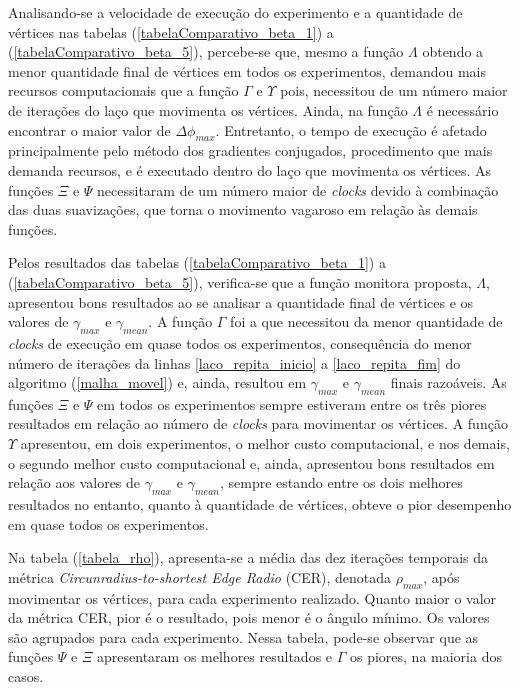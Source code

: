 Analisando-se a velocidade de execução do experimento e a quantidade de vértices nas tabelas (\ref{tabelaComparativo_beta_1}) a (\ref{tabelaComparativo_beta_5}), percebe-se que, mesmo a função $\Lambda$ obtendo a menor quantidade final de vértices em todos os experimentos,  demandou mais recursos computacionais que a função $\Gamma$ e $\Upsilon$ pois, necessitou de um número maior de iterações do laço que movimenta os vértices. Ainda, na função $\Lambda$ é necessário encontrar o maior valor de $\Delta \phi_{max}$. Entretanto, o tempo de execução é afetado principalmente pelo método dos gradientes conjugados, procedimento que mais demanda recursos, e é executado dentro do laço que movimenta os vértices. As funções $\Xi$ e $\Psi$ necessitaram de um número maior de {\it clocks} devido à combinação das duas suavizações, que torna o movimento vagaroso em relação às demais funções.

Pelos resultados das tabelas (\ref{tabelaComparativo_beta_1}) a (\ref{tabelaComparativo_beta_5}), verifica-se que a função monitora proposta, $\Lambda$, apresentou bons resultados ao se analisar a quantidade final de vértices e os valores de $\gamma_{max}$ e $\gamma_{mean}$. A função $\Gamma$ foi a que necessitou da menor quantidade de {\it clocks} de execução em quase todos os experimentos, consequência do menor número de iterações da linhas \ref{laco_repita_inicio} a \ref{laco_repita_fim} do algoritmo (\ref{malha_movel}) e, ainda, resultou em $\gamma_{max}$ e $\gamma_{mean}$ finais razoáveis. As funções $\Xi$ e $\Psi$ em todos os experimentos sempre estiveram entre os três piores resultados em relação ao número de {\it clocks} para movimentar os vértices. A função $\Upsilon$ apresentou, em dois experimentos, o melhor custo computacional, e nos demais, o segundo melhor custo computacional e, ainda, apresentou bons resultados em relação aos valores de $\gamma_{max}$ e $\gamma_{mean}$, sempre estando entre os dois melhores resultados no entanto, quanto à quantidade de vértices, obteve o pior desempenho em quase todos os experimentos. 

Na tabela (\ref{tabela_rho}), apresenta-se a média das dez iterações temporais da métrica {\it Circunradius-to-shortest Edge Radio} (CER), denotada $\rho_{max}$, após movimentar os vértices, para cada experimento realizado. Quanto maior o valor da métrica CER, pior é o resultado, pois menor é o ângulo mínimo. Os valores são agrupados para cada experimento. Nessa tabela, pode-se observar que as funções $\Psi$ e $\Xi$ apresentaram os melhores resultados e $\Gamma$ os piores, na maioria dos casos.

